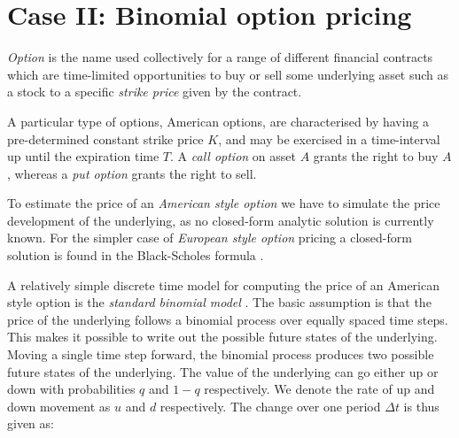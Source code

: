 \documentclass{llncs2e/llncs}
\begin{document}

\section{Case II: Binomial option pricing}
\emph{Option} is the name used collectively for a range of different
financial contracts which are time-limited opportunities to buy or
sell some underlying asset such as a stock to a specific \emph{strike
  price} given by the contract.

A particular type of options, American options, are
characterised by having a pre-determined constant strike price $K$,
and may be exercised in a time-interval up until the expiration time
$T$. A \emph{call option} on asset $A$ grants the right to buy $A$,
whereas a \emph{put option} grants the right to sell.

To estimate the price of an \emph{American style option} we have to
simulate the price development of the underlying, as no closed-form
analytic solution is currently known. For the simpler case of
\emph{European style option} pricing a closed-form solution is found
in the Black-Scholes formula \cite{black1973pricing}.

A relatively simple discrete time model for computing the price of an
American style option is the \emph{standard binomial model}
\cite{cox1979option}.  The basic assumption is that the price of the
underlying follows a binomial process over equally spaced time
steps. This makes it possible to write out the possible future states
of the underlying. Moving a single time step forward, the binomial
process produces two possible future states of the underlying. The
value of the underlying can go either up or down with probabilities
$q$ and $1 - q$ respectively. We denote the rate of up and down
movement as $u$ and $d$ respectively. The change over one period
$\Delta t$ is thus given as:
\end{document}

